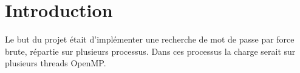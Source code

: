 \section*{Introduction} %
\label{sec:introduction}
Le but du projet était d'implémenter une recherche de mot de passe par force brute, répartie sur plusieurs processus. Dans ces processus la charge serait sur plusieurs threads OpenMP.

